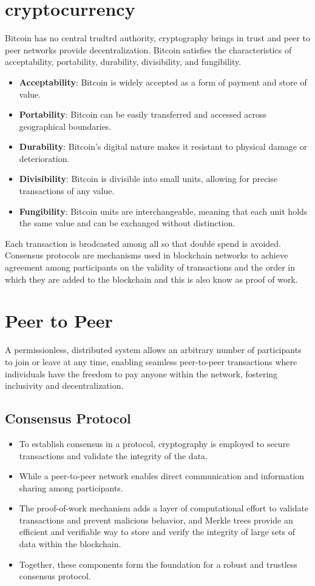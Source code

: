 \documentclass{report}
\begin{document}
\section{cryptocurrency}
Bitcoin has no central trudtrd authority, cryptography brings in trust and peer to peer networks provide decentralization. Bitcoin satisfies the characteristics of acceptability, portability, durability, divisibility, and fungibility.
\begin{itemize}
\item \textbf{Acceptability}: Bitcoin is widely accepted as a form of payment and store of value.
\item \textbf{Portability}: Bitcoin can be easily transferred and accessed across geographical boundaries.
\item \textbf{Durability}: Bitcoin's digital nature makes it resistant to physical damage or deterioration.
\item \textbf{Divisibility}: Bitcoin is divisible into small units, allowing for precise transactions of any value.
\item \textbf{Fungibility}: Bitcoin units are interchangeable, meaning that each unit holds the same value and can be exchanged without distinction.
\end{itemize}
Each transaction is brodcasted among all so that double spend is avoided. \\
Consensus protocols are mechanisms used in blockchain networks to achieve agreement among participants on the validity of transactions and the order in which they are added to the blockchain and this is also know as proof of work.
\section{Peer to Peer}
A permissionless, distributed system allows an arbitrary number of participants to join or leave at any time, enabling seamless peer-to-peer transactions where individuals have the freedom to pay anyone within the network, fostering inclusivity and decentralization.
\subsection{Consensus Protocol}
\begin{itemize}
\item To establish consensus in a protocol, cryptography is employed to secure transactions and validate the integrity of the data. 
\item While a peer-to-peer network enables direct communication and information sharing among participants. 
\item The proof-of-work mechanism adds a layer of computational effort to validate transactions and prevent malicious behavior, and Merkle trees provide an efficient and verifiable way to store and verify the integrity of large sets of data within the blockchain. 
\item Together, these components form the foundation for a robust and trustless consensus protocol.
\end{itemize}
\end{document}
